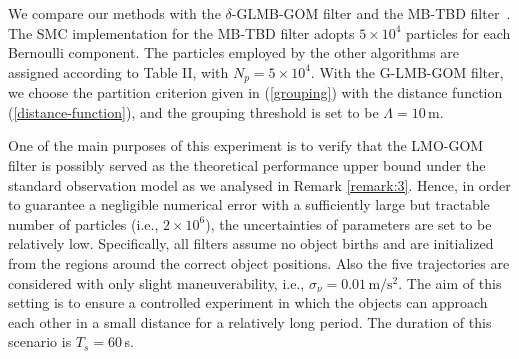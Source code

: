 \documentclass[journal]{IEEEtran}
\begin{document}
{We compare our methods with  the $\delta$-GLMB-GOM filter and the  MB-TBD filter~\cite{refr:MeMber_filter}. The SMC implementation for the MB-TBD filter adopts $5\times 10^4$ particles for each Bernoulli component.   The particles employed by 
the other algorithms are assigned according to Table II, with  $N_p=5\times 10^{4}$.  With the  G-LMB-GOM filter, we choose the partition criterion given in  (\ref{grouping}) with the distance function  (\ref{distance-function}), and the grouping threshold is set to be $\Lambda=10$\,m.

 One of the main purposes of this experiment is  to verify that the LMO-GOM filter is possibly served as the theoretical performance upper bound under the standard observation model as we analysed in Remark \ref{remark:3}. Hence, in order to  guarantee a negligible numerical error with a sufficiently large but tractable number of particles  (i.e., $2\times 10^{6}$), the uncertainties of parameters are set to be relatively low. Specifically, all filters assume no object births and are initialized from the regions around  the correct object positions. Also the five trajectories are considered with only slight maneuverability, i.e., $\sigma_\nu=0.01\,\text{m}/\text{s}^{2}$.  
The aim of this setting is to ensure a controlled experiment in which the objects can approach each other in a small distance for a relatively long period.  The duration of this scenario is  $T_s=60$\,s.

}
\end{document}
